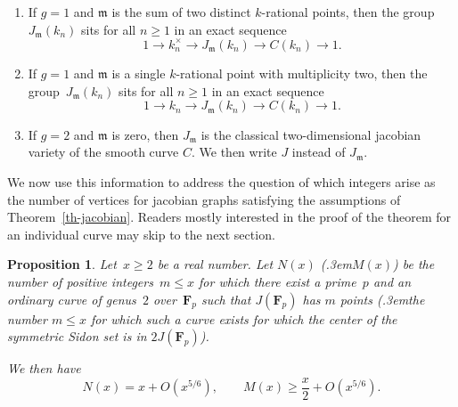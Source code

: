 \documentclass[12pt]{amsart}
\newcommand{\respup}[1]{\emph{(}\resp {#1}\emph{)}}
\renewcommand{\leq}{\leqslant}
\renewcommand{\geq}{\geqslant}
\numberwithin{equation}{section}
\newcommand{\Ff}{\mathbf{F}}
\def\resp{\text{resp.}\kern.3em}
\newcommand{\mfm}{\mathfrak{m}}
\theoremstyle{plain}
\newtheorem{proposition}[theorem]{Proposition}
\theoremstyle{remark}
\theoremstyle{definition}
\renewcommand{\geq}{\geqslant}
\renewcommand{\leq}{\leqslant}
\begin{document}
\begin{enumerate}
\item If $g=1$ and $\mfm$ is the sum of two distinct $k$-rational
  points, then the group $J_{\mfm}(k_n)$ sits for all $n\geq 1$ in an
  exact sequence
  \begin{equation}\label{eq-exact-1}
    1\to k_n^{\times}\to J_{\mfm}(k_n)\to C(k_n)\to 1. 
  \end{equation}
  
\item If $g=1$ and $\mfm$ is a single $k$-rational point with
  multiplicity two, then the group~$J_{\mfm}(k_n)$ sits for all
  $n\geq 1$ in an exact sequence
  \begin{equation}\label{eq-exact-2}
    1\to k_n\to J_{\mfm}(k_n)\to C(k_n)\to 1.
  \end{equation}
  
\item If $g=2$ and $\mfm$ is zero, then $J_{\mfm}$ is the classical
  two-dimensional jacobian variety of the smooth curve $C$. We then write $J$ instead of $J_{\mfm}$. 
\end{enumerate}

We now use this information to address the question of which
integers arise as the number of vertices for jacobian graphs satisfying
the assumptions of Theorem~\ref{th-jacobian}. Readers mostly interested
in the proof of the theorem for an individual curve may skip to the next
section.

\begin{proposition}\label{pr-n}
  Let~$x\geq 2$ be a real number. Let $N(x)$ \respup{$M(x)$} be the
  number of positive integers~$m\leq x$ for which there exist a
  prime~$p$ and an ordinary curve of genus~$2$ over~$\Ff_p$ such that $J(\Ff_p)$ has $m$ points  \respup{the number
    $m\leq x$ for which such a curve exists for which the center of
    the symmetric Sidon set is in $2J(\Ff_p)$}.

  We then have
  \[
    N(x)=x+O(x^{5/6}),\quad\quad M(x)\geq \frac{x}{2}+O(x^{5/6}).
  \]
\end{proposition}
\end{document}
